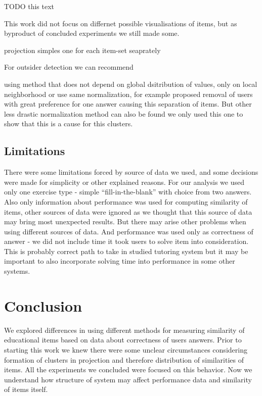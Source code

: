 \documentclass[
  digital, %
  table,   %
  nolof,     %
  nolot,     %
  nocover,
  color
]{fithesis3}
\begin{document}
TODO this text


This work did not focus on differnet possible visualisations of items, but as byproduct of concluded experiments we still made some.

projection
simples one
for each item-set seaprately



For outsider detection we can recommend

using method that does not depend on global dsitribution of values, only on local neighborhood
or
use same normalization, for example proposed removal of users with great preference for one answer causing this separation of items. But other less drastic normalization method can also be found we only used this one to show that this is a cause for this clusters.


\section{Limitations}\label{limitations}

There were some limitations forced by source of data we used, and some decisions were made for simplicity or other explained reasons. For our analysis we used only one exercise type - simple ``fill-in-the-blank'' with choice from two answers. Also only information about performance was used for computing similarity of items, other sources of data were ignored as we thought that this source of data may bring most unexpected results. But there may arise other problems when using different sources of data. And performance was used only as correctness of answer - we did not include time it took users to solve item into consideration. This is probably correct path to take in studied tutoring system but it may be important to also incorporate solving time into performance in some other systems.

\chapter{Conclusion}



We explored differences in using different methods for measuring similarity of educational items based on data about correctness of users answers. Prior to starting this work we knew there were some unclear circumstances considering formation of clusters in projection and therefore distribution of similarities of items. All the experiments we concluded were focused on this behavior. Now we understand how structure of system may affect performance data and similarity of items itself.
\end{document}
